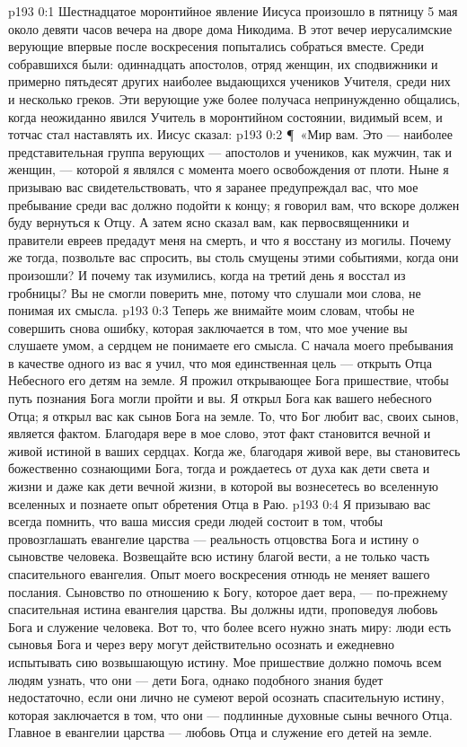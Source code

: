 \vs p193 0:1 Шестнадцатое моронтийное явление Иисуса произошло в пятницу 5 мая около девяти часов вечера на дворе дома Никодима. В этот вечер иерусалимские верующие впервые после воскресения попытались собраться вместе. Среди собравшихся были: одиннадцать апостолов, отряд женщин, их сподвижники и примерно пятьдесят других наиболее выдающихся учеников Учителя, среди них и несколько греков. Эти верующие уже более получаса непринужденно общались, когда неожиданно явился Учитель в моронтийном состоянии, видимый всем, и тотчас стал наставлять их. Иисус сказал:
\vs p193 0:2 \P\ «Мир вам. Это --- наиболее представительная группа верующих --- апостолов и учеников, как мужчин, так и женщин, --- которой я являлся с момента моего освобождения от плоти. Ныне я призываю вас свидетельствовать, что я заранее предупреждал вас, что мое пребывание среди вас должно подойти к концу; я говорил вам, что вскоре должен буду вернуться к Отцу. А затем ясно сказал вам, как первосвященники и правители евреев предадут меня на смерть, и что я восстану из могилы. Почему же тогда, позвольте вас спросить, вы столь смущены этими событиями, когда они произошли? И почему так изумились, когда на третий день я восстал из гробницы? Вы не смогли поверить мне, потому что слушали мои слова, не понимая их смысла.
\vs p193 0:3 Теперь же внимайте моим словам, чтобы не совершить снова ошибку, которая заключается в том, что мое учение вы слушаете умом, а сердцем не понимаете его смысла. С начала моего пребывания в качестве одного из вас я учил, что моя единственная цель --- открыть Отца Небесного его детям на земле. Я прожил открывающее Бога пришествие, чтобы путь познания Бога могли пройти и вы. Я открыл Бога как вашего небесного Отца; я открыл вас как сынов Бога на земле. То, что Бог любит вас, своих сынов, является фактом. Благодаря вере в мое слово, этот факт становится вечной и живой истиной в ваших сердцах. Когда же, благодаря живой вере, вы становитесь божественно сознающими Бога, тогда и рождаетесь от духа как дети света и жизни и даже как дети вечной жизни, в которой вы вознесетесь во вселенную вселенных и познаете опыт обретения Отца в Раю.
\vs p193 0:4 Я призываю вас всегда помнить, что ваша миссия среди людей состоит в том, чтобы провозглашать евангелие царства --- реальность отцовства Бога и истину о сыновстве человека. Возвещайте всю истину благой вести, а не только часть спасительного евангелия. Опыт моего воскресения отнюдь не меняет вашего послания. Сыновство по отношению к Богу, которое дает вера, --- по\hyp{}прежнему спасительная истина евангелия царства. Вы должны идти, проповедуя любовь Бога и служение человека. Вот то, что более всего нужно знать миру: люди есть сыновья Бога и через веру могут действительно осознать и ежедневно испытывать сию возвышающую истину. Мое пришествие должно помочь всем людям узнать, что они --- дети Бога, однако подобного знания будет недостаточно, если они лично не сумеют верой осознать спасительную истину, которая заключается в том, что они --- подлинные духовные сыны вечного Отца. Главное в евангелии царства --- любовь Отца и служение его детей на земле.

